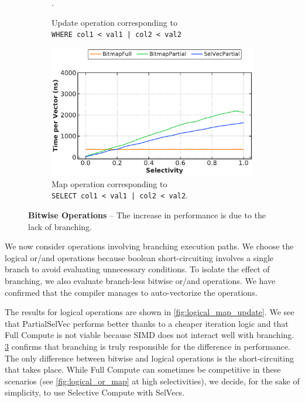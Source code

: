 \documentclass[12pt]{cmuthesis}
\begin{document}
\begin{figure}[t!]
\begin{subfigure}[t]{.49\linewidth}
 \caption{Update operation corresponding to \\ \texttt{\footnotesize WHERE col1 < val1 | col2 < val2}}.
  \label{fig:bitwise_or_update}
\end{subfigure}%
\begin{subfigure}[t]{.49\linewidth}
 \centering
 \includegraphics[width=0.9\linewidth]{eval/bitwise_or_map.pdf}
 \caption{Map operation corresponding to \\ \texttt{\footnotesize SELECT col1 < val1 | col2 < val2}.}
  \label{fig:bitwise_or_map}
\end{subfigure}

\caption{\textbf{Bitwise Operations} -- The increase in performance is due to the lack of branching.}
\label{fig:bitwise_map_update}
\end{figure}

We now consider operations involving branching execution paths. We choose the logical or/and operations because boolean short-circuiting involves a single branch to avoid evaluating unnecessary conditions. To isolate the effect of branching, we also evaluate branch-less bitwise or/and operations. We have confirmed that the compiler manages to auto-vectorize the operations.

The results for logical operations are shown in \cref{fig:logical_map_update}. We see that PartialSelVec performs better thanks to a cheaper iteration logic and that Full Compute is not viable because SIMD does not interact well with branching. \cref{fig:bitwise_map_update} confirms that branching is truly responsible for the difference in performance. The only difference between bitwise and logical operations is the short-circuiting that takes place. While Full Compute can sometimes be competitive in these scenarios (see \cref{fig:logical_or_map} at high selectivities), we decide, for the sake of simplicity, to use Selective Compute with SelVecs.
\end{document}
